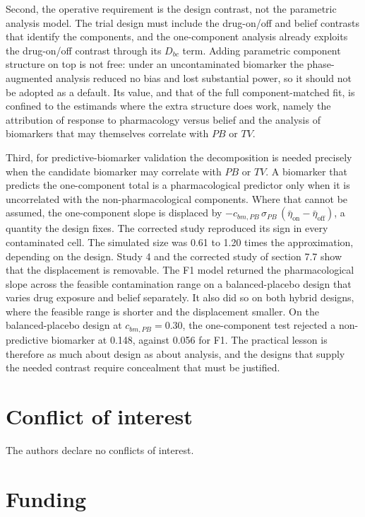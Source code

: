 \documentclass[
  11pt,
]{article}
\begin{document}
Second, the operative requirement is the design contrast, not the parametric
analysis model. The trial design must include the drug-on/off and belief
contrasts that identify the components, and the one-component analysis already
exploits the drug-on/off contrast through its \(D_{bc}\) term. Adding parametric
component structure on top is not free: under an uncontaminated biomarker the
phase-augmented analysis reduced no bias and lost substantial power, so it
should not be adopted as a default. Its value, and that of the full
component-matched fit, is confined to the estimands where the extra structure
does work, namely the attribution of response to pharmacology versus belief
and the analysis of biomarkers that may themselves correlate with \(PB\) or
\(TV\).

Third, for predictive-biomarker validation the decomposition is needed
precisely when the candidate biomarker may correlate with \(PB\) or \(TV\). A
biomarker that predicts the one-component total is a pharmacological
predictor only when it is uncorrelated with the non-pharmacological
components. Where that cannot be assumed, the one-component slope is
displaced by \(-c_{bm,PB}\,\sigma_{PB}\,(\bar\eta_{\text{on}} -
\bar\eta_{\text{off}})\), a quantity the design fixes. The corrected study
reproduced its sign in every contaminated cell. The simulated size was
0.61 to
1.20 times the
approximation, depending on the design. Study 4 and the corrected study
of section 7.7 show that the displacement is removable. The F1 model returned the
pharmacological slope across the feasible contamination range on a
balanced-placebo design that varies drug exposure and belief separately.
It also did so on both hybrid designs, where the feasible range is
shorter and the displacement smaller. On the balanced-placebo design at
\(c_{bm,PB} = 0.30\), the one-component test rejected a non-predictive
biomarker at
0.148,
against 0.056
for F1. The practical lesson is therefore as
much about design as about analysis, and the designs that supply the
needed contrast require concealment that must be justified.

\section{Conflict of interest}\label{conflict-of-interest}

The authors declare no conflicts of interest.

\section{Funding}\label{funding}
\end{document}
